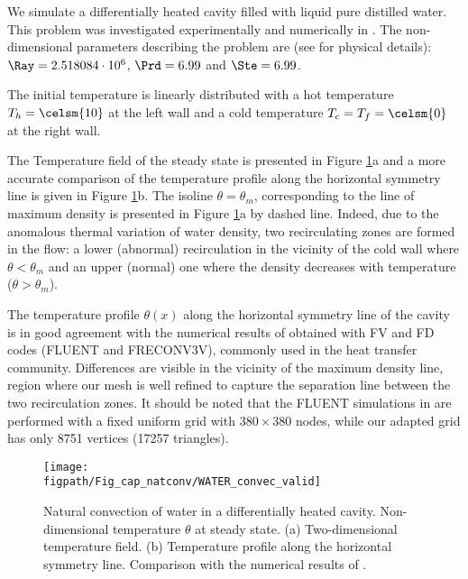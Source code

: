 We simulate a differentially heated cavity filled with liquid pure distilled water. 
This problem was investigated experimentally and numerically in \cite{Giangi-2000,Kowalewski-1999,Kowalewski-2003}.
The non-dimensional parameters describing the problem are (see \cite{Kowalewski-2003} for physical details): $\Ray=2.518084\cdot 10^{6}$, $\Prd=6.99$ and $\Ste = 6.99$.

The initial temperature is linearly distributed with a hot temperature $T_h =\celsm{10}$ at the left wall and a cold temperature $T_c=T_f=\celsm{0}$ at the right wall.

The Temperature field of the steady state is presented in Figure \ref{fig-T1w-isoT}a and a more accurate comparison of the temperature profile along the horizontal symmetry line is given in Figure \ref{fig-T1w-isoT}b. 
The isoline $\theta = \theta_m$, corresponding to the line of maximum density is presented in Figure \ref{fig-T1w-isoT}a by dashed line.
Indeed, due to the anomalous thermal variation of water density, two recirculating zones are formed in the flow: a lower (abnormal) recirculation  in the vicinity of the cold wall where $\theta<\theta_m$ and an upper (normal) one where the density decreases with temperature ($\theta>\theta_m$).

The temperature profile $\theta(x)$ along the horizontal symmetry line of the cavity is in good agreement with the numerical results   of \cite{Kowalewski-2003} obtained with FV and FD codes (FLUENT and FRECONV3V), commonly used in the heat transfer community. Differences are visible in the vicinity of the maximum density line, region where our mesh is well refined to capture the separation line between the two recirculation zones. It should be noted that the FLUENT simulations in \cite{Kowalewski-2003} are performed with a fixed uniform grid with $380\times380$ nodes, while our adapted grid has only 8751 vertices (17257 triangles).

\begin{figure}
	\begin{center}
		\texttt{[image: \\figpath/Fig\_cap\_natconv/WATER\_convec\_valid]}
	\end{center}
	\caption{Natural convection of water in a differentially heated cavity. Non-dimensional temperature $\theta$ at steady state. (a) Two-dimensional temperature  field. (b) Temperature profile along the horizontal symmetry line. Comparison with the numerical results of \cite{Kowalewski-2003}.}
	\label{fig-T1w-isoT} %
\end{figure}

